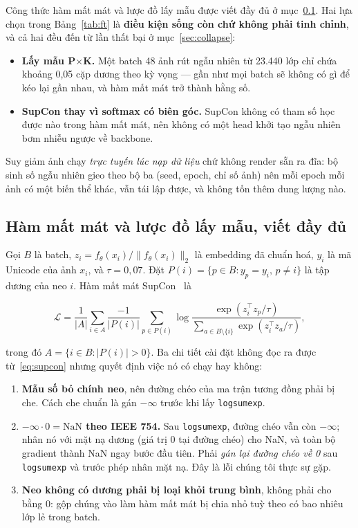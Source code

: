 \documentclass[conference,a4paper]{IEEEtran}
\newcommand{\code}[1]{{\small\texttt{#1}}}
\begin{document}
Công thức hàm mất mát và lược đồ lấy mẫu được viết đầy đủ ở mục~\ref{sec:loss}.
Hai lựa chọn trong Bảng~\ref{tab:ft} là \textbf{điều kiện sống còn chứ không phải tinh chỉnh}, và cả
hai đều đến từ lần thất bại ở mục~\ref{sec:collapse}:

\begin{itemize}
  \item \textbf{Lấy mẫu P$\times$K.} Một batch 48 ảnh rút ngẫu nhiên từ 23.440 lớp chỉ chứa khoảng
        0,05 cặp dương theo kỳ vọng --- gần như mọi batch sẽ không có gì để kéo lại gần nhau, và hàm
        mất mát trở thành hằng số.
  \item \textbf{SupCon thay vì softmax có biên góc.} SupCon không có tham số học được nào trong hàm
        mất mát, nên không có một head khởi tạo ngẫu nhiên bơm nhiễu ngược về backbone.
\end{itemize}

Suy giảm ảnh chạy \emph{trực tuyến lúc nạp dữ liệu} chứ không render sẵn ra đĩa: bộ sinh số ngẫu
nhiên gieo theo bộ ba (seed, epoch, chỉ số ảnh) nên mỗi epoch mỗi ảnh có một biến thể khác, vẫn tái
lập được, và không tốn thêm dung lượng nào.

\subsection{Hàm mất mát và lược đồ lấy mẫu, viết đầy đủ}
\label{sec:loss}

Gọi $B$ là batch, $z_i = f_\theta(x_i)/\lVert f_\theta(x_i)\rVert_2$ là embedding đã chuẩn hoá,
$y_i$ là mã Unicode của ảnh $x_i$, và $\tau = 0{,}07$. Đặt $P(i) = \{p \in B : y_p = y_i,\, p \neq
i\}$ là tập dương của neo $i$. Hàm mất mát SupCon~\cite{supcon} là

\begin{equation}
\label{eq:supcon}
\mathcal{L} = \frac{1}{|A|}\sum_{i \in A}
\frac{-1}{|P(i)|}\sum_{p \in P(i)}
\log \frac{\exp(z_i^{\!\top} z_p/\tau)}
          {\displaystyle\sum_{a \in B \setminus \{i\}} \exp(z_i^{\!\top} z_a/\tau)},
\end{equation}

trong đó $A = \{i \in B : |P(i)| > 0\}$. Ba chi tiết cài đặt không đọc ra được từ~\eqref{eq:supcon}
nhưng quyết định việc nó có chạy hay không:

\begin{enumerate}
  \item \textbf{Mẫu số bỏ chính neo}, nên đường chéo của ma trận tương đồng phải bị che. Cách che
        chuẩn là gán $-\infty$ trước khi lấy \code{logsumexp}.
  \item \textbf{$-\infty \cdot 0 = \mathrm{NaN}$ theo IEEE 754.} Sau \code{logsumexp}, đường chéo
        vẫn còn $-\infty$; nhân nó với mặt nạ dương (giá trị 0 tại đường chéo) cho NaN, và toàn bộ
        gradient thành NaN ngay bước đầu tiên. Phải \emph{gán lại đường chéo về 0} sau
        \code{logsumexp} và trước phép nhân mặt nạ. Đây là lỗi chúng tôi thực sự gặp.
  \item \textbf{Neo không có dương phải bị loại khỏi trung bình}, không phải cho bằng 0: gộp chúng
        vào làm hàm mất mát bị chia nhỏ tuỳ theo có bao nhiêu lớp lẻ trong batch.
\end{enumerate}
\end{document}
